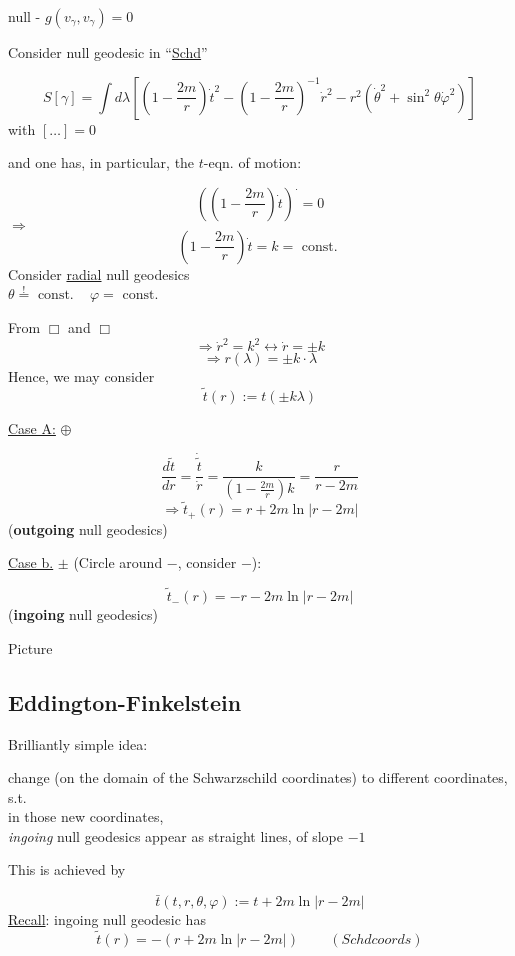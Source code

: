 \documentclass[10pt, twoside]{amsart}
\begin{document}
\begin{multicols*}{2}
null - $g(v_{\gamma},v_{\gamma} ) = 0$

Consider null geodesic in ``\underline{Schd}''

\[
S[\gamma ] = \int d\lambda \left[ \left( 1 - \frac{2m}{r} \right)\dot{t}^2 - \left(1 - \frac{2m}{r} \right)^{-1} \dot{r}^2 - r^2( \dot{\theta}^2 + \sin^2{\theta} \dot{\varphi}^2 ) \right]
\]
with $[\dots ] =0$

and one has, in particular, the $t$-eqn. of motion:

\[
\left( \left( 1-  \frac{2m}{r} \right) \dot{t} \right)^{.} = 0
\]
$\Longrightarrow$
\[
\boxed{ \left( 1 - \frac{2m}{r} \right)\dot{t} = k } = \text{ const. }
\]
Consider \underline{radial} null geodesics \\
$\theta \overset{!}{=} \text{ const. }$ \quad \quad \, $\varphi = \text{ const. }$

From $\Box $ and $\Box $
\[
\Longrightarrow \dot{r}^2 = k^2 \leftrightarrow \dot{r} = \pm k
\]
\[
\Longrightarrow r(\lambda) = \pm k \cdot \lambda
\]
Hence, we may consider 
\[
\widetilde{t}(r) := t(\pm k\lambda)
\]

\underline{Case A:} $\oplus$

\[
\frac{d\widetilde{t}}{dr} = \frac{ \dot{ \widetilde{t}} }{ \dot{r}} = \frac{k}{ \left( 1 - \frac{2m}{r} \right) k } = \frac{r}{r-2m}
\]
\[
\Longrightarrow \widetilde{t}_+(r) = r + 2m \ln{ |r-2m | }
\]
(\textbf{outgoing} null geodesics)

\underline{Case b.} $\pm$ (Circle around $-$, consider $-$):

\[
\widetilde{t}_-(r) = -r - 2m \ln{ |r - 2m | }
\]
(\textbf{ingoing} null geodesics)

Picture

\subsection{Eddington-Finkelstein}

Brilliantly simple idea: 

change (on the domain of the Schwarzschild coordinates) to different coordinates, s.t.  \\ 
in those new coordinates, \\
\emph{ingoing} null geodesics appear as straight lines, of slope $-1$ 

This is achieved by 

\[
\bar{t}(t,r,\theta, \varphi) := t + 2m \ln{ | r-2m | }
\]
\underline{Recall}: ingoing null geodesic has 
\[
\widetilde{t}(r) = -(r + 2m \ln{ |r-2m |} )  \quad \quad \, (Schd coords)
\]


\end{multicols*}
\end{document}
